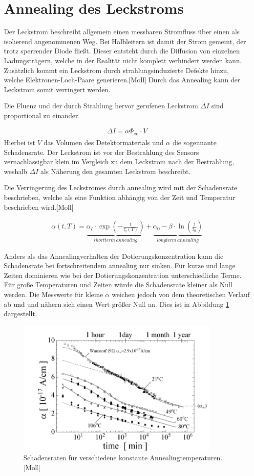 \section{Annealing des Leckstroms}
Der Leckstrom beschreibt allgemein einen messbaren Stromfluss über einen als isolierend
angenommenen Weg. Bei Halbleitern ist damit der Strom gemeint, der trotz sperrender
Diode fließt. Dieser entsteht durch die Diffusion von einzelnen Ladungsträgern, welche
in der Realität nicht komplett verhindert werden kann.
Zusätzlich kommt ein Leckstrom durch strahlungsinduzierte Defekte hinzu, welche
Elektronen-Loch-Paare generieren.[Moll]
Durch das Annealing kann der Leckstrom somit verringert werden.

Die Fluenz und der durch Strahlung hervor gerufenen Leckstrom $\Delta I$ sind
proportional zu einander.

\begin{align}
  \Delta I = \alpha \Phi_{\mathrm{eq}} \cdot V
\end{align}
Hierbei ist $V$ das Volumen des Detektormaterials und $\alpha$ die
sogennante Schadensrate. Der Leckstrom ist vor der Bestrahlung des Sensors
vernachlässigbar klein im Vergleich zu dem Leckstrom nach der Bestrahlung,
weshalb $\Delta I$ als Näherung den gesamten Leckstrom beschreibt.

Die Verringerung des Leckstromes durch annealing wird mit der Schadensrate
beschrieben, welche als eine Funktion abhängig von der Zeit und
Temperatur beschrieben wird.[Moll]

\begin{align}
  \alpha(t, T) = \underbrace{\alpha_I \cdot \exp{\left(-\frac{t}{\tau_{\mathrm{I}}(T)}\right)}}_{shortterm \: annealing} + \underbrace{\alpha_{\mathrm{0}} -\beta \cdot \ln{\left(\frac{t}{t_{\mathrm{0}}}\right)}}_{longterm \: annealing}
\end{align}

Anders als das Annealingverhalten der Dotierungskonzentration kann die Schadensrate
bei fortschreitendem annealing nur sinken. Für kurze und
lange Zeiten dominieren wie bei der Dotierungskonzentration unterschiedliche
Terme. Für große Temperaturen und Zeiten würde die Schadensrate kleiner als Null
werden. Die Messwerte für kleine $\alpha$ weichen jedoch von dem
theoretischen Verlauf ab und und nähern sich einen Wert größer Null an. Dies
ist in Abbildung \ref{fig:damage_rates} dargestellt.

\begin{figure}
  \includegraphics[width=0.9\textwidth]{logos/schadensraten.PNG}
  \caption{Schadensraten für verschiedene konstante Annealingtemperaturen.[Moll]}
  \label{fig:damage_rates}
\end{figure}
